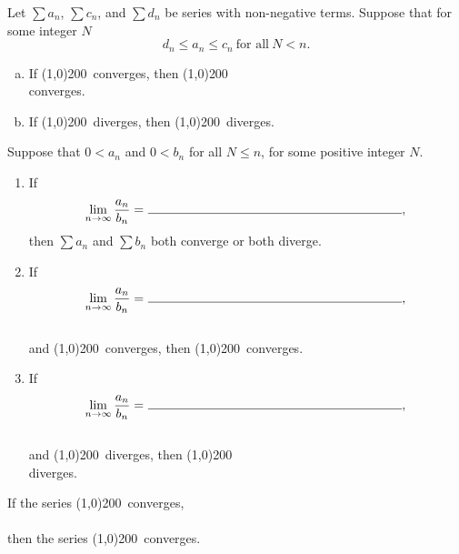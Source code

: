 \documentclass[12pt]{amsart}
\begin{document}
\begin{thm}
  Let \(\sum a_n\), \(\sum c_n\), and \(\sum d_n\) be series with non-negative terms.
  Suppose that for some integer \(N\)
  \[d_n \leq a_n \leq c_n\ \text{for all}\ N < n.\]
  \vspace{.10in}
  \begin{enumerate}[(a)]
  \item
    If \line(1,0){200}\ converges, then \line(1,0){200}\\
    converges.
    \vspace{.10in}
  \item
    If \line(1,0){200}\ diverges, then \line(1,0){200}\ diverges.
  \end{enumerate}
\end{thm}

\begin{thm}
  Suppose that \(0 < a_n\) and \(0 < b_n\) for all \(N \leq n\), for some positive integer \(N\).
  \vspace{.10in}
  \begin{enumerate}
  \item
    If
    \[\lim_{n \to \infty} \frac{a_n}{b_n} =\ \line(1,0){200},\,\]
    then \(\sum a_n\) and \(\sum b_n\) both converge or both diverge.
    \vspace{.10in}
  \item
    If
    \[\lim_{n \to \infty} \frac{a_n}{b_n} =\ \line(1,0){200},\,\]
    \vspace{.10in}\\
    and \line(1,0){200}\ converges, then \line(1,0){200}\ converges.\\
    
  \item
    If
    \[\lim_{n \to \infty} \frac{a_n}{b_n} =\ \line(1,0){200},\,\]
    \vspace{.10in}\\
    and \line(1,0){200}\ diverges, then \line(1,0){200}\\
    diverges.
  \end{enumerate}
\end{thm}

\begin{thm}
  If the series \line(1,0){200}\ converges,\\
  \vspace{.10in}\\
  then the series \line(1,0){200}\ converges.
\end{thm}
\end{document}
